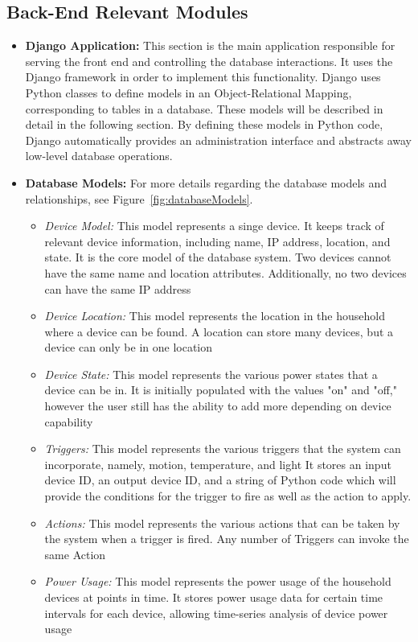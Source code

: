 \documentclass[10pt,twocolumn]{witseiepaper}
\begin{document}
	\subsection{Back-End Relevant Modules}
	\begin{itemize}
		\item \textbf{Django Application:} This section is the main application responsible for serving the front end and controlling the database interactions. It uses the Django framework in order to implement this functionality. Django uses Python classes to define models in an Object-Relational Mapping, corresponding to tables in a database. These models will be described in detail in the following section. By defining these models in Python code, Django automatically provides an administration interface and abstracts away low-level database operations.
		\item \textbf{Database Models:} 
		For more details regarding the database models and relationships, see Figure~\ref{fig:databaseModels}.
		\begin{itemize}
			\item \textit{Device Model:} This model represents a singe device. It keeps track of relevant device information, including name, IP address, location, and state. It is the core model of the database system. Two devices cannot have the same name and location attributes. Additionally, no two devices can have the same IP address
			\item \textit{Device Location:} This model represents the location in the household where a device can be found. A location can store many devices, but a device can only be in one location
			\item \textit{Device State:} This model represents the various power states that a device can be in. It is initially populated with the values "on" and "off," however the user still has the ability to add more depending on device capability
			\item \textit{Triggers:} This model represents the various triggers that the system can incorporate, namely, motion, temperature, and light
			It stores an input device ID, an output device ID, and a string of Python code which will provide the conditions for the trigger to fire as well as the action to apply.
			\item \textit{Actions:}  This model represents the various actions that can be taken by the system when a trigger is fired. Any number of Triggers can invoke the same Action
			\item \textit{Power Usage:} This model represents the power usage of the household devices at points in time. It stores power usage data for certain time intervals for each device, allowing time-series analysis of device power usage

\end{itemize}
\end{itemize}
\end{document}
